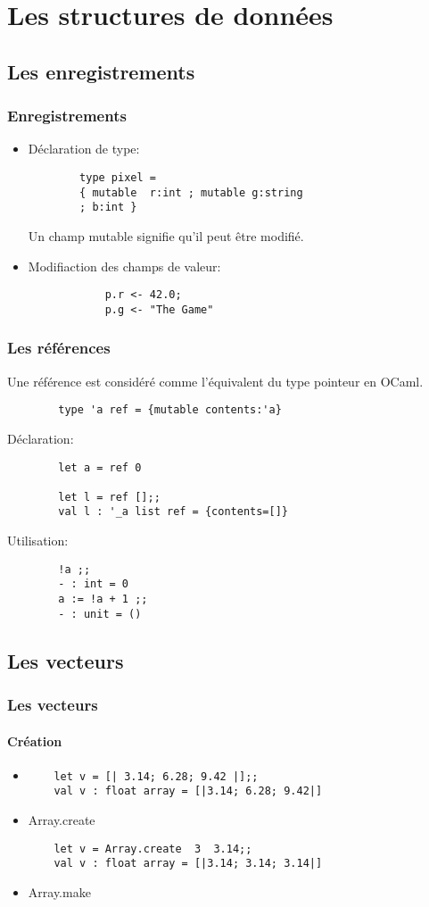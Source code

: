 \section{Les structures de données}


\subsection{Les enregistrements}

\begin{frame}[fragile]
\frametitle{Enregistrements}
\begin{itemize}
	\item Déclaration de type: 
		\begin{lstlisting}
		type pixel = 
		{ mutable  r:int ; mutable g:string 
		; b:int } 
		\end{lstlisting}
		Un champ mutable signifie qu'il peut être modifié.
	
	\item Modifiaction des champs de valeur:
		\begin{lstlisting}
			p.r <- 42.0;
			p.g <- "The Game"
		\end{lstlisting}
\end{itemize}
\end{frame}


\begin{frame}[fragile]
\frametitle{Les références}
	Une référence est considéré comme l'équivalent du type pointeur en OCaml.
	\begin{lstlisting}
		type 'a ref = {mutable contents:'a}
	\end{lstlisting}
	Déclaration:
	\begin{lstlisting}
		let a = ref 0

		let l = ref [];;
		val l : '_a list ref = {contents=[]}
	\end{lstlisting}
	Utilisation:
	\begin{lstlisting}
		!a ;;
		- : int = 0
		a := !a + 1 ;;
		- : unit = ()
	\end{lstlisting}

\end{frame}

\subsection{Les vecteurs}
\begin{frame}[fragile]
\frametitle{Les vecteurs}
	\framesubtitle{Création}
	\begin{itemize}
	\item
	\begin{lstlisting}
	let v = [| 3.14; 6.28; 9.42 |];;
	val v : float array = [|3.14; 6.28; 9.42|]
	\end{lstlisting}

	\item Array.create
	\begin{lstlisting}
	let v = Array.create  3  3.14;;
	val v : float array = [|3.14; 3.14; 3.14|]
	\end{lstlisting}

	\item Array.make
	\end{itemize}
\end{frame}


